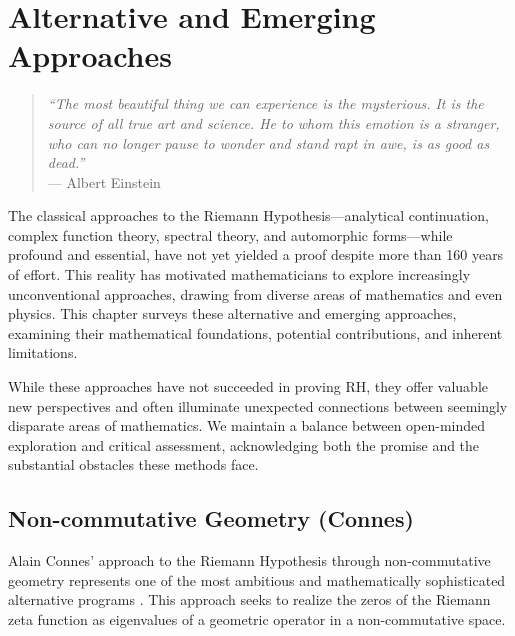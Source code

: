 
\chapter{Alternative and Emerging Approaches}
\label{ch:alternative}

\begin{quote}
\textit{``The most beautiful thing we can experience is the mysterious. It is the source of all true art and science. He to whom this emotion is a stranger, who can no longer pause to wonder and stand rapt in awe, is as good as dead.''} \\
--- Albert Einstein
\end{quote}

The classical approaches to the Riemann Hypothesis---analytical continuation, complex function theory, spectral theory, and automorphic forms---while profound and essential, have not yet yielded a proof despite more than 160 years of effort. This reality has motivated mathematicians to explore increasingly unconventional approaches, drawing from diverse areas of mathematics and even physics. This chapter surveys these alternative and emerging approaches, examining their mathematical foundations, potential contributions, and inherent limitations.

While these approaches have not succeeded in proving RH, they offer valuable new perspectives and often illuminate unexpected connections between seemingly disparate areas of mathematics. We maintain a balance between open-minded exploration and critical assessment, acknowledging both the promise and the substantial obstacles these methods face.

\section{Non-commutative Geometry (Connes)}
\label{sec:noncommutative_geometry}

Alain Connes' approach to the Riemann Hypothesis through non-commutative geometry represents one of the most ambitious and mathematically sophisticated alternative programs \cite{connes1999}. This approach seeks to realize the zeros of the Riemann zeta function as eigenvalues of a geometric operator in a non-commutative space.

